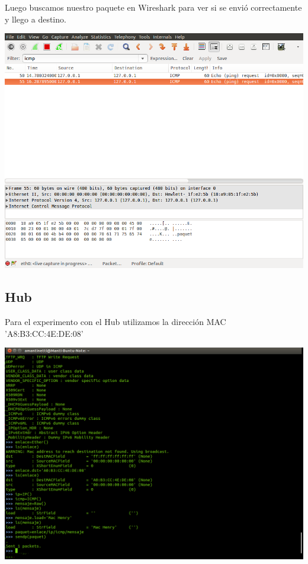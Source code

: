 \documentclass[spanish]{udpreport}
\begin{document}
Luego buscamos nuestro paquete en Wireshark para ver si se envió correctamente y llego a destino.

\begin{center}
	\includegraphics[scale=.37]{imagenes/Switch/Test_2_Wireshark.png}
\end{center}

\pagebreak

\subsection{Hub}

Para el experimento con el Hub utilizamos la dirección MAC 'A8:B3:CC:4E:DE:08'

\begin{center}
	\includegraphics[scale=.27]{imagenes/Hub/sendmanti.png}
	\\
\end{center}
\end{document}
